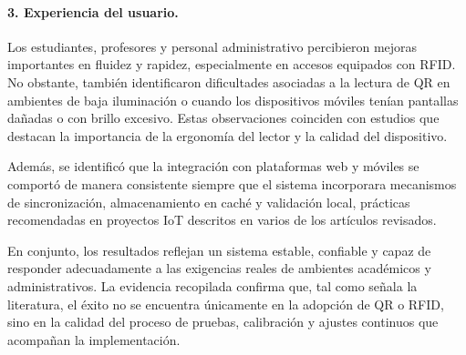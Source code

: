 \paragraph{3. Experiencia del usuario.}
Los estudiantes, profesores y personal administrativo percibieron mejoras importantes en fluidez y rapidez, especialmente en accesos equipados con RFID. No obstante, también identificaron dificultades asociadas a la lectura de QR en ambientes de baja iluminación o cuando los dispositivos móviles tenían pantallas dañadas o con brillo excesivo. Estas observaciones coinciden con estudios que destacan la importancia de la ergonomía del lector y la calidad del dispositivo.

Además, se identificó que la integración con plataformas web y móviles se comportó de manera consistente siempre que el sistema incorporara mecanismos de sincronización, almacenamiento en caché y validación local, prácticas recomendadas en proyectos IoT descritos en varios de los artículos revisados.

En conjunto, los resultados reflejan un sistema estable, confiable y capaz de responder adecuadamente a las exigencias reales de ambientes académicos y administrativos. La evidencia recopilada confirma que, tal como señala la literatura, el éxito no se encuentra únicamente en la adopción de QR o RFID, sino en la calidad del proceso de pruebas, calibración y ajustes continuos que acompañan la implementación.
